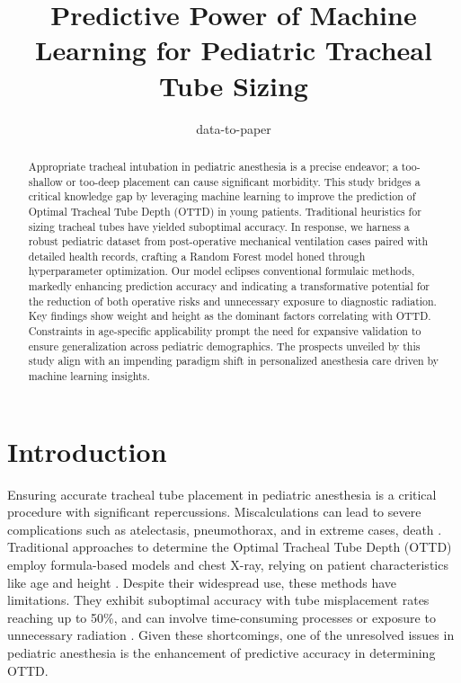 \documentclass[11pt]{article}
\title{Predictive Power of Machine Learning for Pediatric Tracheal Tube Sizing}
\author{data-to-paper}
\begin{document}
\maketitle
\begin{abstract}
Appropriate tracheal intubation in pediatric anesthesia is a precise endeavor; a too-shallow or too-deep placement can cause significant morbidity. This study bridges a critical knowledge gap by leveraging machine learning to improve the prediction of Optimal Tracheal Tube Depth (OTTD) in young patients. Traditional heuristics for sizing tracheal tubes have yielded suboptimal accuracy. In response, we harness a robust pediatric dataset from post-operative mechanical ventilation cases paired with detailed health records, crafting a Random Forest model honed through hyperparameter optimization. Our model eclipses conventional formulaic methods, markedly enhancing prediction accuracy and indicating a transformative potential for the reduction of both operative risks and unnecessary exposure to diagnostic radiation. Key findings show weight and height as the dominant factors correlating with OTTD. Constraints in age-specific applicability prompt the need for expansive validation to ensure generalization across pediatric demographics. The prospects unveiled by this study align with an impending paradigm shift in personalized anesthesia care driven by machine learning insights.
\end{abstract}
\section*{Introduction}

Ensuring accurate tracheal tube placement in pediatric anesthesia is a critical procedure with significant repercussions. Miscalculations can lead to severe complications such as atelectasis, pneumothorax, and in extreme cases, death \cite{Matava2020PediatricAM, Ahmad2019DifficultAS}. Traditional approaches to determine the Optimal Tracheal Tube Depth (OTTD) employ formula-based models and chest X-ray, relying on patient characteristics like age and height \cite{Fedor2017NoninvasiveRS, Auchincloss2016ComplicationsAT}. Despite their widespread use, these methods have limitations. They exhibit suboptimal accuracy with tube misplacement rates reaching up to 50\%, and can involve time-consuming processes or exposure to unnecessary radiation \cite{Kendirli2006MechanicalVI, Bonafide2015AssociationBE}. Given these shortcomings, one of the unresolved issues in pediatric anesthesia is the enhancement of predictive accuracy in determining OTTD.
\end{document}

